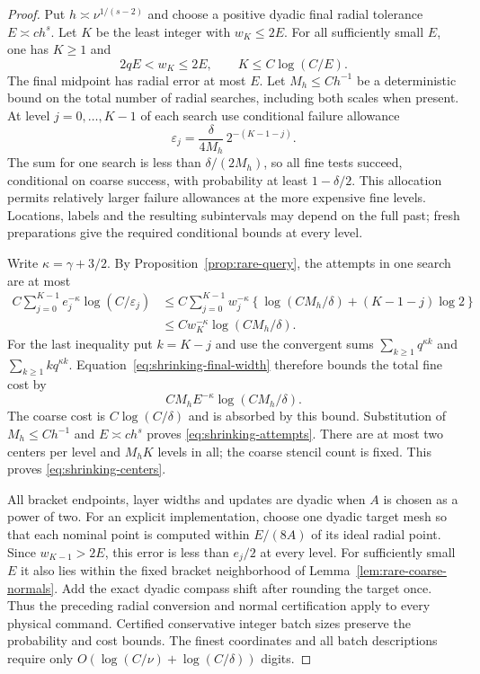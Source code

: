 \begin{proof}
Put $h\asymp\nu^{1/(s-2)}$ and choose a positive dyadic final radial
tolerance $E\asymp c h^s$. Let $K$ be the least integer with
$w_K\le2E$.
For all sufficiently small $E$, one has $K\ge1$ and
\begin{equation}\label{eq:shrinking-final-width}
                   2qE<w_K\le2E,
             \qquad K\le C\log(C/E).
\end{equation}
The final midpoint has radial error at most $E$. Let $M_h\le C h^{-1}$
be a deterministic bound on the total number of radial searches,
including both scales when present. At level $j=0,\ldots,K-1$ of
each search use conditional failure allowance
\begin{equation}\label{eq:shrinking-confidence}
 \varepsilon_j=\frac{\delta}{4M_h}\,2^{-(K-1-j)}.
\end{equation}
The sum for one search is less than $\delta/(2M_h)$, so all fine
tests succeed, conditional on coarse success, with probability at least
$1-\delta/2$. This allocation permits relatively larger failure
allowances at the more expensive fine levels. Locations, labels and
the resulting subintervals may depend on the full past; fresh
preparations give the required conditional bounds at every level.

Write $\kappa=\gamma+3/2$. By Proposition~\ref{prop:rare-query},
the attempts in one search are at most
\begin{align*}
 C\sum_{j=0}^{K-1} e_j^{-\kappa}
                                  \log(C/\varepsilon_j)
 &\le C\sum_{j=0}^{K-1} w_j^{-\kappa}
          \left\{\log(CM_h/\delta)+(K-1-j)\log2\right\}\\
 &\le C w_K^{-\kappa}\log(CM_h/\delta).
\end{align*}
For the last inequality put $k=K-j$ and use the convergent sums
$\sum_{k\ge1}q^{\kappa k}$ and
$\sum_{k\ge1}kq^{\kappa k}$. Equation~\eqref{eq:shrinking-final-width}
therefore bounds the total fine cost by
\[
                         C M_h E^{-\kappa}\log(CM_h/\delta).
\]
The coarse cost is $C\log(C/\delta)$ and is absorbed by this bound.
Substitution of $M_h\le C h^{-1}$ and $E\asymp c h^s$ proves
\eqref{eq:shrinking-attempts}. There are at most two centers per
level and $M_hK$ levels in all; the coarse stencil count is fixed.
This proves \eqref{eq:shrinking-centers}.

All bracket endpoints, layer widths and updates are dyadic when $A$
is chosen as a power of two. For an explicit implementation, choose
one dyadic target mesh so that each nominal point is computed within
$E/(8A)$ of its ideal radial point. Since
$w_{K-1}>2E$, this error is less than $e_j/2$ at every level.
For sufficiently small $E$ it also lies within the fixed bracket
neighborhood of Lemma~\ref{lem:rare-coarse-normals}. Add the exact
dyadic compass shift after rounding the target once. Thus the preceding
radial conversion and normal certification apply to every physical
command. Certified conservative integer batch sizes preserve the
probability and cost bounds. The finest coordinates and all batch
descriptions require only
$O(\log(C/\nu)+\log(C/\delta))$ digits.


\end{proof}
